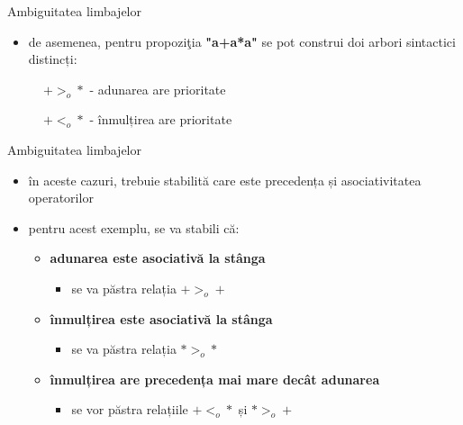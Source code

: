 \documentclass[pdf]{beamer}
\begin{document}
\begin{frame}{Ambiguitatea limbajelor}

\begin{itemize}
\item 
de asemenea, pentru propoziţia \textbf{"a+a*a"} se pot construi doi arbori sintactici distincți:
\end{itemize}

\begin{figure}[H]
\begin{minipage}[c][1\width]{0.3\textwidth}
\centering
\caption{$+ >_o *$ - adunarea are prioritate}
\end{minipage}
\begin{minipage}[c]{0.4\textwidth} 
\centering
\caption{$+ <_o *$ - înmulțirea are prioritate}
\end{minipage}
\end{figure}

\end{frame}



\begin{frame}{Ambiguitatea limbajelor}
\begin{itemize}
\item
în aceste cazuri, trebuie stabilită care este precedența și asociativitatea operatorilor
\item
pentru acest exemplu, se va stabili că:
\begin{itemize}
\item
\textbf{adunarea este asociativă la stânga}
\begin{itemize}
\item
se va păstra relația $+ >_o +$
\end{itemize}
\item
\textbf{înmulțirea este asociativă la stânga}
\begin{itemize}
\item
se va păstra relația $* >_o *$
\end{itemize}
\item
\textbf{înmulțirea are precedența mai mare decât adunarea}
\begin{itemize}
\item
se vor păstra relațiile $+ <_o *$ și $* >_o +$
\end{itemize}
\end{itemize}
\end{itemize}
\end{frame}
\end{document}

